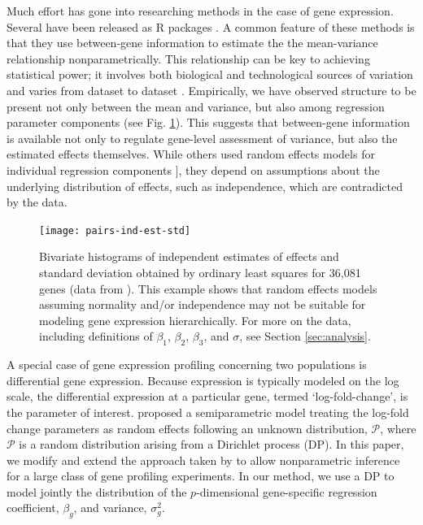 Much effort has gone into researching methods in the case of gene expression. Several have been released as R packages \citep{edger2010,deseq2014,voom}. A common feature of these methods is that they use between-gene information to estimate the the  mean-variance relationship nonparametrically. This relationship can be key to achieving statistical power; it involves both biological and technological sources of variation and varies from dataset to dataset \citep{voom}. Empirically, we have observed structure to be present not only between the mean and variance, but also among regression parameter components (see Fig. \ref{pairs-ind-est}). This suggests that between-gene information is available not only to regulate gene-level assessment of variance, but also the estimated effects themselves. While others used random effects models for individual regression components \citep{deseq2014,landau}], they depend on assumptions about the underlying distribution of effects, such as independence, which are contradicted by the data.

\begin{figure}[ht]
\centering
\texttt{[image: pairs-ind-est-std]}
\caption{\small Bivariate histograms of independent estimates of effects and standard deviation obtained by ordinary least squares for 36,081 genes (data from \cite{paschold}). This example shows that random effects models assuming normality and/or independence may not be suitable for modeling gene expression hierarchically. For more on the data, including definitions of $\beta_1$, $\beta_2$, $\beta_3$, and $\sigma$, see Section \ref{sec:analysis}.}
\label{pairs-ind-est}
\end{figure}

A special case of gene expression profiling concerning two populations is differential gene expression. Because expression is typically modeled on the log scale, the differential expression at a particular gene, termed `log-fold-change', is the parameter of interest. \citet{liu} proposed a semiparametric model treating the log-fold change parameters as random effects following an unknown distribution, $\mathcal{P}$, where $\mathcal{P}$ is a random distribution arising from a Dirichlet process (DP). In this paper, we modify and extend the approach taken by \cite{liu} to allow nonparametric inference for a large class of gene profiling experiments. In our method, we use a DP to model jointly the distribution of the $p$-dimensional gene-specific regression coefficient, $\beta_g$, and variance, $\sigma^2_g$.

